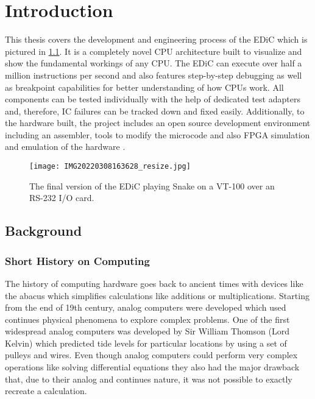 \chapter{Introduction} \label{cha:intro}
This thesis covers the development and engineering process of the \gls{EDiC} which is pictured in \cref{fig:EDiCSnake}.
It is a completely novel \gls{CPU} architecture built to visualize and show the fundamental workings of any \gls{CPU}.
The \gls{EDiC} can execute over half a million instructions per second and also features step-by-step debugging as well as breakpoint capabilities for better understanding of how \glspl{CPU} work.
All components can be tested individually with the help of dedicated test adapters and, therefore, \gls{IC} failures can be tracked down and fixed easily.
Additionally, to the hardware built, the project includes an open source development environment including an assembler, tools to modify the microcode and also \gls{FPGA} simulation and emulation of the hardware \cite{EDiCGitHub}.
\begin{figure}[t]
  \centering
  \texttt{[image: IMG20220308163628\_resize.jpg]}
  \caption{The final version of the \gls{EDiC} playing Snake on a VT-100 over an RS-232 I/O card.}
  \label{fig:EDiCSnake}
\end{figure}
\section{Background}
\subsection{Short History on Computing}
The history of computing hardware goes back to ancient times with devices like the abacus which simplifies calculations like additions or multiplications.
Starting from the end of 19th century, analog computers were developed which used continues physical phenomena to explore complex problems.
One of the first widespread analog computers was developed by Sir William Thomson (Lord Kelvin) which predicted tide levels for particular locations by using a set of pulleys and wires. \cite{sep-computing-history}
Even though analog computers could perform very complex operations like solving differential equations \cite{analogDiff} they also had the major drawback that, due to their analog and continues nature, it was not possible to exactly recreate a calculation.

